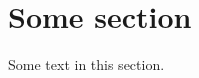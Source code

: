 


\maketitle                                                 %

\begin{abstract}
  Some tips for a \LaTeX\ template.
\end{abstract}

\section{Some section}
  Some text in this section.


